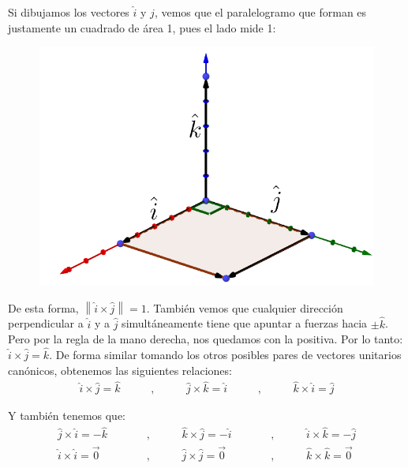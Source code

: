 \documentclass[12pt, fleqn]{report}                             %
\DeclareMathOperator \MegaSpace {\quad \quad}                   %
\theoremstyle{break}                                            %
\newcommand{\Abs}[1]{\left\lVert #1 \right\lVert}               %
\begin{document}
            Si dibujamos los vectores $\hat{i}$ y $\hat{j}$, vemos que el paralelogramo que forman es justamente un cuadrado de área 1, pues el lado mide 1:
            \begin{figure}[H]
                \centering
                \includegraphics[scale=0.6]{unitVectors.png}
            \end{figure}
        
            De esta forma, $\Abs{\hat{i} \times \hat{j}} = 1$. También vemos que cualquier dirección perpendicular a $\hat{i}$ y a $\hat{j}$ simultáneamente tiene que apuntar a fuerzas hacia $\pm \hat{k}$. Pero por la regla de la mano derecha, nos quedamos con la positiva. Por lo tanto: $\hat{i} \times \hat{j} = \hat{k}$. De forma similar tomando los otros posibles pares de vectores unitarios canónicos, obtenemos las siguientes relaciones:
            \begin{align}
                \hat{i} \times \hat{j} = \hat{k} \MegaSpace , \MegaSpace \hat{j} \times \hat{k} = \hat{i} \MegaSpace , \MegaSpace \hat{k} \times \hat{i} = \hat{j}
            \end{align}
            
            Y también tenemos que:
            \begin{align}
                \hat{j} \times \hat{i} = -\hat{k} \MegaSpace &, \MegaSpace \hat{k} \times \hat{j} = -\hat{i} \MegaSpace &, \MegaSpace \hat{i} \times \hat{k} = -\hat{j}\\
                \hat{i} \times \hat{i} = \vec{0} \MegaSpace &, \MegaSpace \hat{j} \times \hat{j} = \vec{0} \MegaSpace &, \MegaSpace \hat{k} \times \hat{k} = \vec{0}
            \end{align}
            
\end{document}
